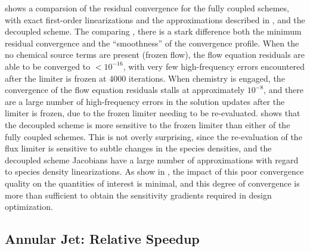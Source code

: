  shows a comparsion of the residual convergence for the
fully coupled schemes, with exact first-order linearizations and the
approximations described in , and
the decoupled scheme.  The comparing
, there is a stark
difference both the minimum residual convergence and the ``smoothness'' of the
convergence profile.  When the no chemical source terms are present (frozen
flow), the flow equation residuals are able to be converged to $ < 10^{-16}$,
with very few high-frequency errors encountered after the limiter is frozen at
4000 iterations.  When chemistry is engaged, the convergence of the flow
equation residuals stalls at approximately $10^{-8}$, and there are a large
number of high-frequency errors in the solution updates after the limiter is
frozen, due to the frozen limiter needing to be re-evaluated.
 shows that the decoupled scheme is more
sensitive to the frozen limiter than either of the fully coupled schemes.  This
is not overly surprising, since the re-evaluation of the flux limiter is
sensitive to subtle changes in the species densities, and the decoupled
scheme Jacobians have a large number of approximations with regard to species
density linearizations.  As show in , the
impact of this poor convergence quality on the quantities of interest is
minimal, and this degree of convergence is more than sufficient to obtain the
sensitivity gradients required in design optimization.

\subsection{Annular Jet: Relative Speedup}

